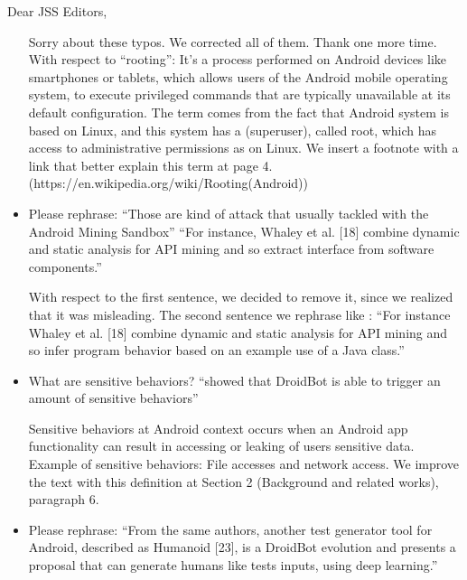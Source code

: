 \documentclass[12pt,english]{scrartcl}
\begin{document}
\begin{letter}{Dear JSS Editors,}
\begin{itemize}
\vspace{0.2cm}

{\color{blue}{\bf Answer.} Sorry about these typos. We corrected all of them. Thank one more time. With respect to ``rooting'': It's a process performed on Android devices like smartphones or tablets, which allows users of the Android mobile operating system, to execute privileged commands that are typically unavailable at its default configuration. The term comes from the fact that Android system is based on Linux, and this system has a (superuser), called root, which has access to administrative permissions as on Linux. We insert a footnote with a link that better explain this term at page 4.\newline
(https://en.wikipedia.org/wiki/Rooting(Android))
}

\vspace{0.2cm}

\item Please rephrase:
``Those are kind of attack that usually tackled with the Android Mining Sandbox''
``For instance, Whaley et al. [18] combine dynamic and static analysis for API mining and so extract interface from software components.''


\vspace{0.2cm}

{\color{blue}{\bf Answer.} With respect to the first sentence, we decided to remove it, since we realized that it was misleading. The second sentence we rephrase like : ``For instance Whaley et al. [18] combine dynamic and static analysis for API mining and so infer program behavior based on an example use of a Java class.''}

\vspace{0.2cm}

\item What are sensitive behaviors? ``showed that DroidBot is able to trigger an amount of sensitive behaviors''


\vspace{0.2cm}

{\color{blue}{\bf Answer.} Sensitive behaviors at Android context occurs when an Android app functionality can result in accessing or leaking of users sensitive data. Example of sensitive behaviors: File accesses and network access. We improve the text with this definition at Section 2 (Background and related works), paragraph 6.}

\vspace{0.2cm}

\item Please rephrase:
``From the same authors, another test generator tool for Android, described as Humanoid [23], is a DroidBot evolution and
presents a proposal that can generate humans like tests inputs, using deep learning.''



\end{itemize}
\end{letter}
\end{document}
